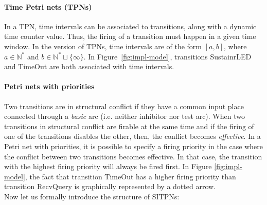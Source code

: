 \documentclass[pdflatex,sn-mathphys]{sn-jnl}%
\theoremstyle{thmstyleone}%
\theoremstyle{thmstyletwo}%
\theoremstyle{thmstylethree}%
\begin{document}
\paragraph{Time Petri nets (TPNs)}

In a TPN, time intervals can be associated to transitions, along with
a dynamic time counter value. Thus, the firing of a transition must
happen in a given time window. In the \hilecop{} version of TPNs, time
intervals are of the form $[a, b]$, where $a\in\mathbb{N}^{*}$ and
$b\in\mathbb{N}^{*}\sqcup\{\infty\}$.  In Figure~\ref{fig:impl-model},
transitions SustainrLED and TimeOut are both associated with time
intervals.

\paragraph{Petri nets with priorities}

Two transitions are in structural conflict if they have a common input
place connected through a \textit{basic} arc (i.e. neither inhibitor
nor test arc). When two transitions in structural conflict are firable
at the same time and if the firing of one of the transitions disables
the other, then, the conflict becomes \textit{effective}. In a Petri
net with priorities, it is possible to specify a firing priority in
the case where the conflict between two transitions becomes
effective. In that case, the transition with the highest firing
priority will always be fired first. In Figure \ref{fig:impl-model},
the fact that transition TimeOut has a higher firing priority than
transition RecvQuery is graphically represented by a dotted arrow. \\

\noindent{}Now let us formally introduce the structure of SITPNs:
\end{document}

